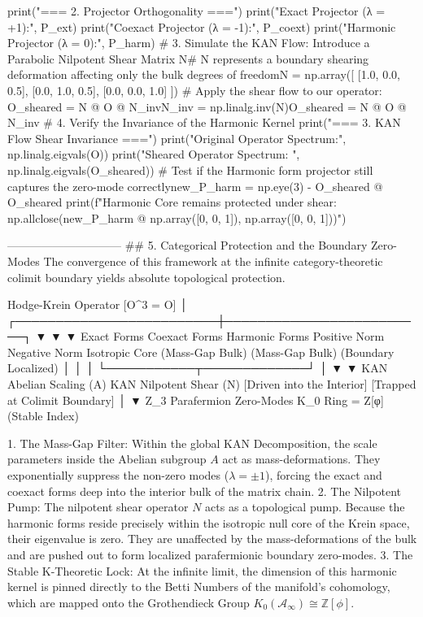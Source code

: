 print("\n=== 2. Projector Orthogonality ===")
print("Exact Projector (λ = +1):\n", P_ext)
print("Coexact Projector (λ = -1):\n", P_coext)
print("Harmonic Projector (λ = 0):\n", P_harm)
# 3. Simulate the KAN Flow: Introduce a Parabolic Nilpotent Shear Matrix N# N represents a boundary shearing deformation affecting only the bulk degrees of freedomN = np.array([
    [1.0, 0.0, 0.5],
    [0.0, 1.0, 0.5],
    [0.0, 0.0, 1.0]
])
# Apply the shear flow to our operator: O_sheared = N @ O @ N_invN_inv = np.linalg.inv(N)O_sheared = N @ O @ N_inv
# 4. Verify the Invariance of the Harmonic Kernel
print("\n=== 3. KAN Flow Shear Invariance ===")
print("Original Operator Spectrum:", np.linalg.eigvals(O))
print("Sheared Operator Spectrum: ", np.linalg.eigvals(O_sheared))
# Test if the Harmonic form projector still captures the zero-mode correctlynew_P_harm = np.eye(3) - O_sheared @ O_sheared
print(f"Harmonic Core remains protected under shear: {np.allclose(new_P_harm @ np.array([0, 0, 1]), np.array([0, 0, 1]))}")

------------------------------
## 5. Categorical Protection and the Boundary Zero-Modes
The convergence of this framework at the infinite category-theoretic colimit boundary yields absolute topological protection.

                    Hodge-Krein Operator [O^3 = O]
                                   │
         ┌─────────────────────────┼─────────────────────────┐
         ▼                         ▼                         ▼
   Exact Forms                Coexact Forms             Harmonic Forms
  Positive Norm                 Negative Norm            Isotropic Core
 (Mass-Gap Bulk)               (Mass-Gap Bulk)        (Boundary Localized)
         │                         │                         │
         └───────────┬─────────────┘                         │
                     ▼                                       ▼
         KAN Abelian Scaling (A)                    KAN Nilpotent Shear (N)
     [Driven into the Interior]                 [Trapped at Colimit Boundary]
                                                             │
                                                             ▼
                                                Z_3 Parafermion Zero-Modes
                                                K_0 Ring = Z[φ] (Stable Index)


   1. The Mass-Gap Filter: Within the global KAN Decomposition, the scale parameters inside the Abelian subgroup $A$ act as mass-deformations. They exponentially suppress the non-zero modes ($\lambda = \pm 1$), forcing the exact and coexact forms deep into the interior bulk of the matrix chain.
   2. The Nilpotent Pump: The nilpotent shear operator $N$ acts as a topological pump. Because the harmonic forms reside precisely within the isotropic null core of the Krein space, their eigenvalue is zero. They are unaffected by the mass-deformations of the bulk and are pushed out to form localized parafermionic boundary zero-modes.
   3. The Stable K-Theoretic Lock: At the infinite limit, the dimension of this harmonic kernel is pinned directly to the Betti Numbers of the manifold's cohomology, which are mapped onto the Grothendieck Group $K_0(\mathcal{A}_\infty) \cong \mathbb{Z}[\phi]$.

